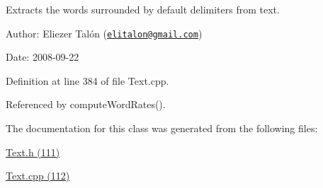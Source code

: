 Extracts the words surrounded by default delimiters from text. 

\begin{Desc}
\item[Author:]Eliezer Talón (\href{mailto:elitalon@gmail.com}{\tt elitalon@gmail.com}) \end{Desc}
\begin{Desc}
\item[Date:]2008-09-22 \end{Desc}


Definition at line 384 of file Text.cpp.

Referenced by computeWordRates().

The documentation for this class was generated from the following files:\begin{CompactItemize}
\item 
\hyperlink{_text_8h}{Text.h (111)}\item 
\hyperlink{_text_8cpp}{Text.cpp (112)}\end{CompactItemize}
